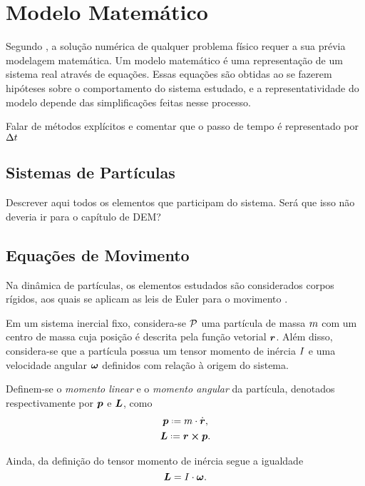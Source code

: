 \chapter{Modelo Matemático} \label{ch:mathematical_model}

Segundo , a solução numérica de qualquer problema físico requer a sua prévia modelagem matemática. Um modelo matemático é uma representação de um sistema real através de equações. Essas equações são obtidas ao se fazerem hipóteses sobre o comportamento do sistema estudado, e a representatividade do modelo depende das simplificações feitas nesse processo.

\alert{Falar de métodos explícitos e comentar que o passo de tempo é representado por \(\Delta t\)}

\section{Sistemas de Partículas}

\alert{Descrever aqui todos os elementos que participam do sistema. Será que isso não deveria ir para o capítulo de DEM?}

\section{Equações de Movimento}

Na dinâmica de partículas, os elementos estudados são considerados corpos rígidos, aos quais se aplicam as leis de Euler para o movimento \cite{bib:sampaio}.

Em um sistema inercial fixo, considera-se \(\mathcal{P}\) uma partícula de massa \(m\) com um centro de massa cuja posição é descrita pela função vetorial \(\bm{r}\). Além disso, considera-se que a partícula possua um tensor momento de inércia \(I\) e uma velocidade angular \(\bm{\omega}\) definidos com relação à origem do sistema.

Definem-se o \textit{momento linear} e o \textit{momento angular} da partícula, denotados respectivamente por \(\bm{p}\) e \(\bm{L}\), como
\begin{gather*}
	\linearMomentum \eqdef \mass\cdot\velocity, \\
	\angularMomentum \eqdef \position\cross\linearMomentum.
\end{gather*}

Ainda, da definição do tensor momento de inércia segue a igualdade
\begin{equation*}
	\bm{L} = I\cdot\bm{\omega}.
\end{equation*}

